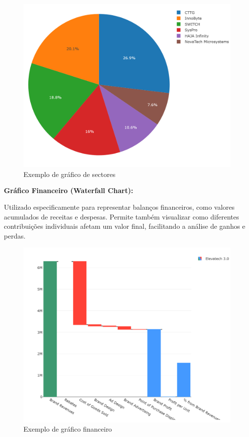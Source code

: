 \begin{figure}[H]
    \centering
    \includegraphics[max width=12cm, keepaspectratio]{./img/pie}
    \caption{Exemplo de gráfico de sectores}
\end{figure}
\noindent

\textbf{Gráfico Financeiro (Waterfall Chart):}  

Utilizado especificamente para representar balanços financeiros, como valores acumulados de receitas e despesas. Permite também visualizar como diferentes contribuições individuais afetam um valor final, facilitando a análise de ganhos e perdas.

\begin{figure}[H]
    \centering
    \includegraphics[max width=12cm, keepaspectratio]{./img/waterfall}
    \caption{Exemplo de gráfico financeiro}
\end{figure}
\noindent

